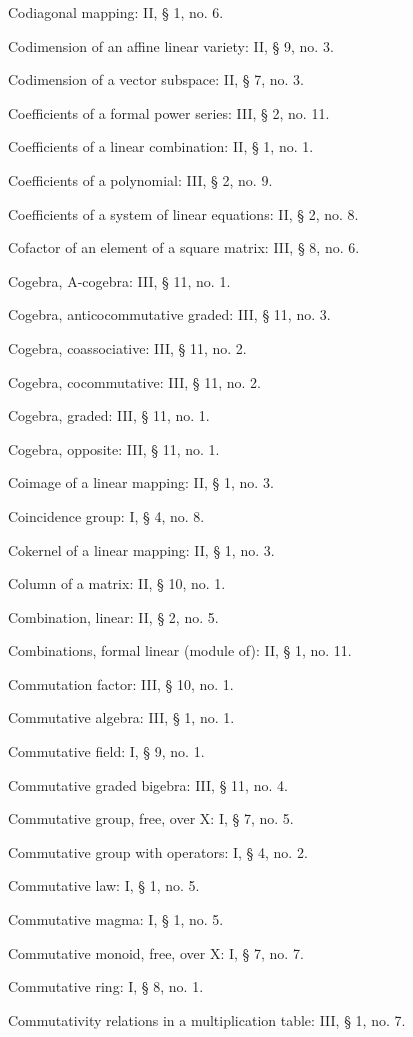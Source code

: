 Codiagonal mapping: II, § 1, no. 6.

Codimension of an affine linear variety: II, § 9, no. 3.

Codimension of a vector subspace: II, § 7, no. 3.

Coefficients of a formal power series: III, § 2, no. 11.

Coefficients of a linear combination: II, § 1, no. 1.

Coefficients of a polynomial: III, § 2, no. 9.

Coefficients of a system of linear equations: II, § 2, no. 8.

Cofactor of an element of a square matrix: III, § 8, no. 6.

Cogebra, A-cogebra: III, § 11, no. 1.

Cogebra, anticocommutative graded: III, § 11, no. 3.

Cogebra, coassociative: III, § 11, no. 2.

Cogebra, cocommutative: III, § 11, no. 2.

Cogebra, graded: III, § 11, no. 1.

Cogebra, opposite: III, § 11, no. 1.

Coimage of a linear mapping: II, § 1, no. 3.

Coincidence group: I, § 4, no. 8.

Cokernel of a linear mapping: II, § 1, no. 3.

Column of a matrix: II, § 10, no. 1.

Combination, linear: II, § 2, no. 5.

Combinations, formal linear (module of): II, § 1, no. 11.

Commutation factor: III, § 10, no. 1.

Commutative algebra: III, § 1, no. 1.

Commutative field: I, § 9, no. 1.

Commutative graded bigebra: III, § 11, no. 4.

Commutative group, free, over X: I, § 7, no. 5.

Commutative group with operators: I, § 4, no. 2.

Commutative law: I, § 1, no. 5.

Commutative magma: I, § 1, no. 5.

Commutative monoid, free, over X: I, § 7, no. 7.

Commutative ring: I, § 8, no. 1.

Commutativity relations in a multiplication table: III, § 1, no. 7.

